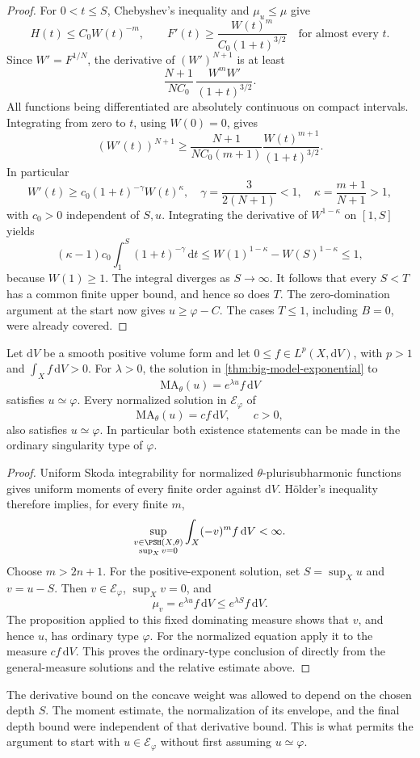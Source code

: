 \begin{proof}
For $0<t\leq S$, Chebyshev's inequality and $\mu_u\leq\mu$ give
\[
 H(t)\leq C_0W(t)^{-m},
 \qquad
 F'(t)\geq\frac{W(t)^m}{C_0(1+t)^{3/2}}
 \quad\text{for almost every }t.
\]
Since $W'=F^{1/N}$, the derivative of $(W')^{N+1}$ is at least
\[
 \frac{N+1}{NC_0}\,
 \frac{W^mW'}{(1+t)^{3/2}}.
\]
All functions being differentiated are absolutely continuous on compact intervals. Integrating from zero to $t$, using $W(0)=0$, gives
\[
 (W'(t))^{N+1}
 \geq\frac{N+1}{NC_0(m+1)}
        \frac{W(t)^{m+1}}{(1+t)^{3/2}}.
\]
In particular
\[
 W'(t)\geq c_0(1+t)^{-\gamma}W(t)^\kappa,
 \quad
 \gamma=\frac{3}{2(N+1)}<1,\quad
 \kappa=\frac{m+1}{N+1}>1,
\]
with $c_0>0$ independent of $S,u$. Integrating the derivative of $W^{1-\kappa}$ on $[1,S]$ yields
\[
 (\kappa-1)c_0\int_1^S(1+t)^{-\gamma}\,\mathrm{d}t
 \leq W(1)^{1-\kappa}-W(S)^{1-\kappa}\leq1,
\]
because $W(1)\geq1$. The integral diverges as $S\to\infty$. It follows that every $S<T$ has a common finite upper bound, and hence so does $T$. The zero-domination argument at the start now gives $u\geq\varphi-C$. The cases $T\leq1$, including $B=0$, were already covered.
\end{proof}

\begin{corollary}\label{cor:big-model-lp-type}
Let $\mathrm{d}V$ be a smooth positive volume form and let $0\leq f\in L^p(X,\mathrm{d}V)$, with $p>1$ and $\int_Xf\,\mathrm{d}V>0$.
For $\lambda>0$, the solution in \cref{thm:big-model-exponential} to
\[
 \mathrm{MA}_\theta(u)=e^{\lambda u}f\,\mathrm{d}V
\]
satisfies $u\simeq\varphi$. Every normalized solution in $\mathcal E_\varphi$ of
\[
 \mathrm{MA}_\theta(u)=cf\,\mathrm{d}V,\qquad c>0,
\]
also satisfies $u\simeq\varphi$. In particular both existence statements can be made in the ordinary singularity type of $\varphi$.
\end{corollary}
\begin{proof}
Uniform Skoda integrability for normalized $\theta$-plurisubharmonic functions gives uniform moments of every finite order against $\mathrm{d}V$. H\"older's inequality therefore implies, for every finite $m$,
\[
 \sup_{\substack{v\in\PSH(X,\theta)\\\sup_Xv=0}}
       \int_X(-v)^m f\,\mathrm{d}V<\infty.
\]
Choose $m>2n+1$. For the positive-exponent solution, set $S=\sup_Xu$ and $v=u-S$. Then $v\in\mathcal E_\varphi$, $\sup_Xv=0$, and
\[
 \mu_v=e^{\lambda u}f\,\mathrm{d}V
 \leq e^{\lambda S}f\,\mathrm{d}V.
\]
The proposition applied to this fixed dominating measure shows that $v$, and hence $u$, has ordinary type $\varphi$. For the normalized equation apply it to the measure $cf\,\mathrm{d}V$. This proves the ordinary-type conclusion of \cite[Corollary 6.1]{XL26} directly from the general-measure solutions and the relative estimate above.
\end{proof}

The derivative bound on the concave weight was allowed to depend on the chosen depth $S$. The moment estimate, the normalization of its envelope, and the final depth bound were independent of that derivative bound. This is what permits the argument to start with $u\in\mathcal E_\varphi$ without first assuming $u\simeq\varphi$.
